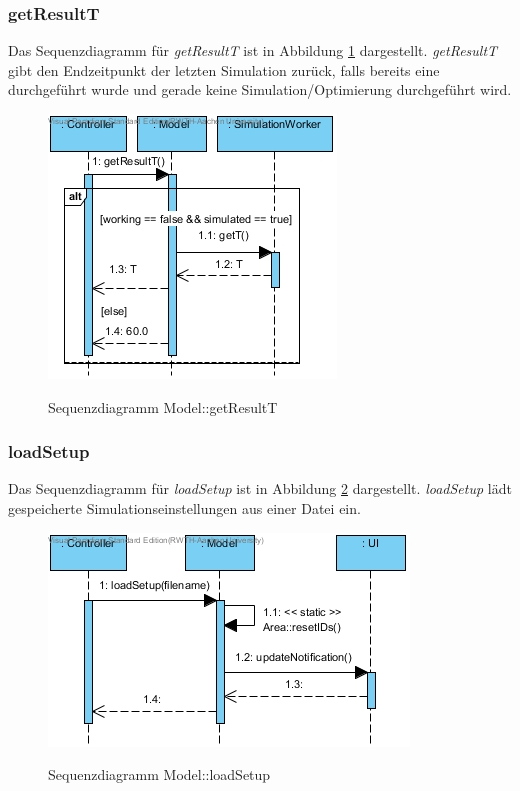 \subsubsection*{getResultT}

Das Sequenzdiagramm für \emph{getResultT} ist in Abbildung \ref{Sequenzdiagramm Model::getResultT} dargestellt. \emph{getResultT} gibt den Endzeitpunkt der letzten Simulation zurück, falls bereits eine durchgeführt wurde und gerade keine Simulation/Optimierung durchgeführt wird.

\begin{figure}[H]
	\centering
	\includegraphics[scale=.85]{Bilder/Model__getResultT().jpg}\\
	\caption{Sequenzdiagramm Model::getResultT}
	\label{Sequenzdiagramm Model::getResultT}
\end{figure}

\subsubsection*{loadSetup}

Das Sequenzdiagramm für \emph{loadSetup} ist in Abbildung \ref{Sequenzdiagramm Model::loadSetup} dargestellt. \emph{loadSetup} lädt gespeicherte Simulationseinstellungen aus einer Datei ein.

\begin{figure}[H]
	\centering
	\includegraphics[scale=.85]{Bilder/Model__loadSetup().jpg}\\
	\caption{Sequenzdiagramm Model::loadSetup}
	\label{Sequenzdiagramm Model::loadSetup}
\end{figure}


